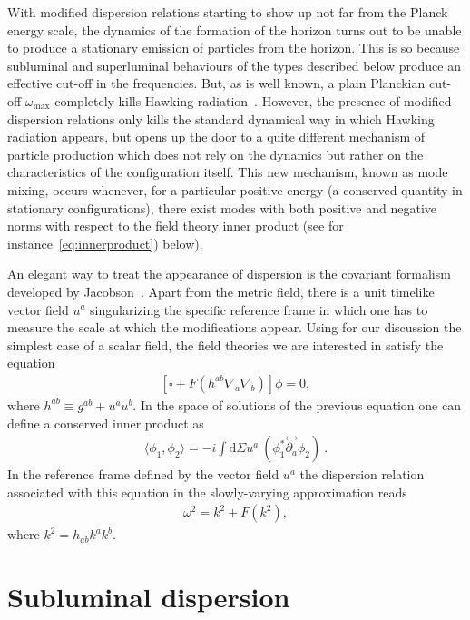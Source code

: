 \documentclass[12pt]{article}
\newcommand{\diff}{\text{d}}
\begin{document}
With modified dispersion relations starting to show up not far from the Planck
energy scale, the dynamics of the formation of the horizon turns out to be unable to
produce a stationary emission of particles from the horizon. 
This is so because
subluminal and superluminal behaviours of the types described below produce an effective cut-off in the frequencies. But, as is well known, a plain Planckian
cut-off $\omega_\text{max}$ completely kills Hawking radiation~\cite{jacobson,barcelo-sensitivity}. However, the presence of modified dispersion relations only kills the standard 
dynamical way in which Hawking radiation appears, but  opens up the door to a quite different mechanism of particle production which does not rely on the dynamics but rather on the characteristics of the configuration itself. This new mechanism, known as mode
mixing, occurs whenever, for a particular positive energy (a conserved quantity
in stationary configurations), there exist modes with both positive and negative
norms with respect to the field theory inner product (see for instance~\ref{eq:innerproduct}) below).
 
An elegant way to treat the appearance of dispersion is the covariant formalism
developed by Jacobson~\cite{jacobson-vector}.  Apart from the metric field, there
is a unit timelike vector field $u^a$ singularizing the specific reference frame in
which one has to measure the scale at which the modifications appear. Using for
our discussion the simplest case of a scalar field, the field theories we are
interested in satisfy the equation
%
\begin{eqnarray}
\left[\square + F(h^{ab} \nabla_a \nabla_b) \right] \phi =0,
\end{eqnarray}
%   
where $h^{ab} \equiv g^{ab}+u^a u^b$. 
In the space of solutions of the previous equation one can define a conserved inner product as 
%
\begin{eqnarray}
\langle \phi_1,\phi_2\rangle =
-i \int \diff\Sigma u^a ~ (\phi_1^* \stackrel{\leftrightarrow}{\partial_a} \phi_2)~.
\label{eq:innerproduct}
\end{eqnarray}
%
 In the reference frame defined by the vector field $u^a$ the dispersion
relation associated with this equation in the slowly-varying
approximation reads
%
\begin{eqnarray}
\omega^2 = k^2 + F(k^2),
\end{eqnarray}
%
where $k^2=h_{ab}k^ak^b$.


\section{Subluminal dispersion}
\label{Sec:Sub}
\end{document}
